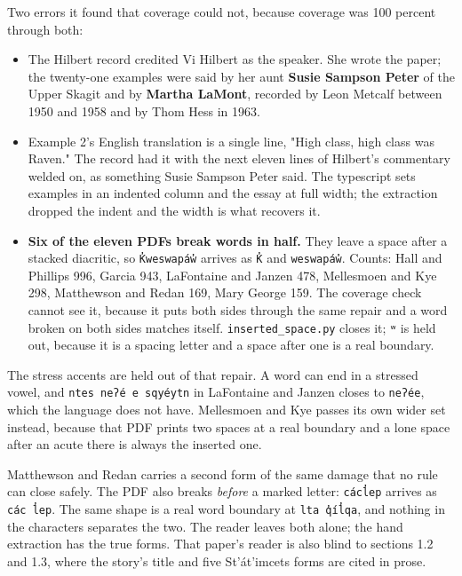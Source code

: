 Two errors it found that coverage could not, because coverage was 100 percent through both:

\begin{itemize}
\item The Hilbert record credited Vi Hilbert as the speaker. She wrote the paper; the twenty-one examples were said by her aunt \textbf{Susie Sampson Peter} of the Upper Skagit and by \textbf{Martha LaMont}, recorded by Leon Metcalf between 1950 and 1958 and by Thom Hess in 1963.
\item Example 2's English translation is a single line, "High class, high class was Raven." The record had it with the next eleven lines of Hilbert's commentary welded on, as something Susie Sampson Peter said. The typescript sets examples in an indented column and the essay at full width; the extraction dropped the indent and the width is what recovers it.
\end{itemize}

\begin{itemize}
\item \textbf{Six of the eleven PDFs break words in half.} They leave a space after a stacked diacritic, so \texttt{K̓weswapáw̓} arrives as \texttt{K̓} and \texttt{weswapáw̓}. Counts: Hall and Phillips 996, Garcia 943, LaFontaine and Janzen 478, Mellesmoen and Kye 298, Matthewson and Redan 169, Mary George 159. The coverage check cannot see it, because it puts both sides through the same repair and a word broken on both sides matches itself. \texttt{inserted\_\allowbreak{}space.\allowbreak{}py} closes it; \texttt{ʷ} is held out, because it is a spacing letter and a space after one is a real boundary.
\end{itemize}

The stress accents are held out of that repair. A word can end in a stressed vowel, and \texttt{ntes neʔé e sqyéytn} in LaFontaine and Janzen closes to \texttt{neʔée}, which the language does not have. Mellesmoen and Kye passes its own wider set instead, because that PDF prints two spaces at a real boundary and a lone space after an acute there is always the inserted one.

Matthewson and Redan carries a second form of the same damage that no rule can close safely. The PDF also breaks \emph{before} a marked letter: \texttt{cácl̓ep} arrives as \texttt{các l̓ep}. The same shape is a real word boundary at \texttt{lta q̓íl̓qa}, and nothing in the characters separates the two. The reader leaves both alone; the hand extraction has the true forms. That paper's reader is also blind to sections 1.2 and 1.3, where the story's title and five St'át'imcets forms are cited in prose.

